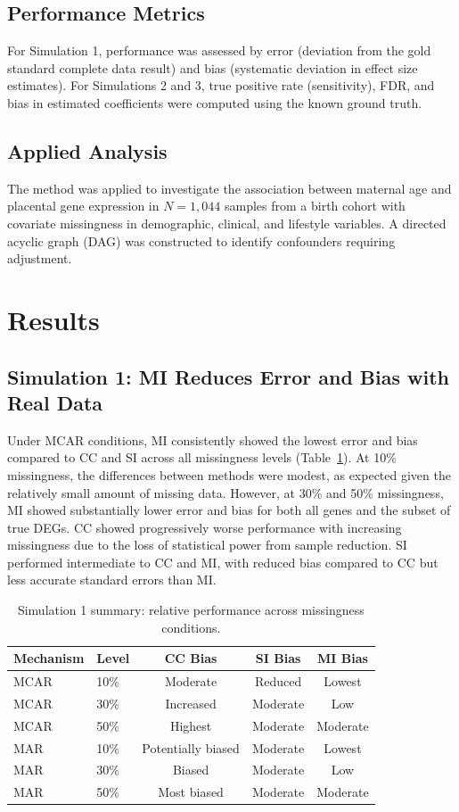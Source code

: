 \documentclass[11pt]{article}
\begin{document}
\subsection{Performance Metrics}

For Simulation 1, performance was assessed by error (deviation from the gold standard complete data result) and bias (systematic deviation in effect size estimates). For Simulations 2 and 3, true positive rate (sensitivity), FDR, and bias in estimated coefficients were computed using the known ground truth.

\subsection{Applied Analysis}

The method was applied to investigate the association between maternal age and placental gene expression in $N = 1{,}044$ samples from a birth cohort with covariate missingness in demographic, clinical, and lifestyle variables. A directed acyclic graph (DAG) was constructed to identify confounders requiring adjustment.

\section{Results}

\subsection{Simulation 1: MI Reduces Error and Bias with Real Data}

Under MCAR conditions, MI consistently showed the lowest error and bias compared to CC and SI across all missingness levels (Table~\ref{tab:sim1}). At 10\% missingness, the differences between methods were modest, as expected given the relatively small amount of missing data. However, at 30\% and 50\% missingness, MI showed substantially lower error and bias for both all genes and the subset of true DEGs. CC showed progressively worse performance with increasing missingness due to the loss of statistical power from sample reduction. SI performed intermediate to CC and MI, with reduced bias compared to CC but less accurate standard errors than MI.

\begin{table}[h]
\centering
\caption{Simulation 1 summary: relative performance across missingness conditions.}
\label{tab:sim1}
\begin{tabular}{llccc}
\toprule
Mechanism & Level & CC Bias & SI Bias & MI Bias \\
\midrule
MCAR & 10\% & Moderate & Reduced & Lowest \\
MCAR & 30\% & Increased & Moderate & Low \\
MCAR & 50\% & Highest & Moderate & Moderate \\
MAR & 10\% & Potentially biased & Moderate & Lowest \\
MAR & 30\% & Biased & Moderate & Low \\
MAR & 50\% & Most biased & Moderate & Moderate \\
\bottomrule
\end{tabular}
\end{table}
\end{document}
